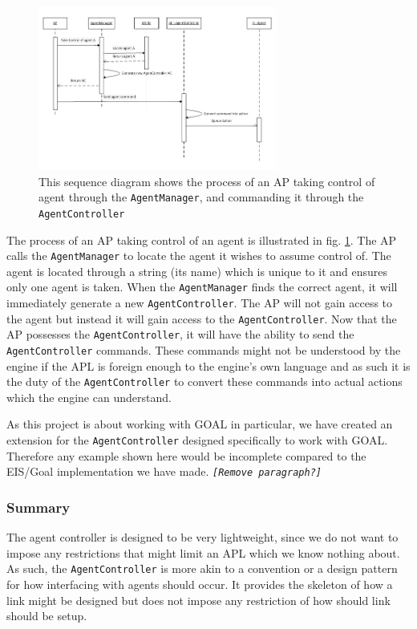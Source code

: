 \begin{figure}
\begin{centering}
\includegraphics[width=0.7\textwidth]{SystemFeatureAgentControllerSequenceDiagram}
\par\end{centering}

\caption{This sequence diagram shows the process of an AP taking control of
agent through the \texttt{AgentManager}, and commanding it through
the \texttt{AgentController\label{fig:APConnectingToAndControllingAC}}}
\end{figure}


The process of an AP taking control of an agent is illustrated in
fig. \ref{fig:APConnectingToAndControllingAC}. The AP calls the \texttt{AgentManager}
to locate the agent it wishes to assume control of. The agent is located
through a string (its name) which is unique to it and ensures only
one agent is taken. When the \texttt{AgentManager} finds the correct
agent, it will immediately generate a new \texttt{AgentController}.
The AP will not gain access to the agent but instead it will gain
access to the \texttt{AgentController}. Now that the AP possesses
the \texttt{AgentController}, it will have the ability to send the
\texttt{AgentController} commands. These commands might not be understood
by the engine if the APL is foreign enough to the engine\textquoteright{}s
own language and as such it is the duty of the \texttt{AgentController}
to convert these commands into actual actions which the engine can
understand.

As this project is about working with GOAL in particular, we have
created an extension for the \texttt{AgentController} designed specifically
to work with GOAL. Therefore any example shown here would be incomplete
compared to the EIS/Goal implementation we have made. \texttt{\emph{{[}Remove
paragraph?{]}}}


\subsubsection*{Summary}

The agent controller is designed to be very lightweight, since we
do not want to impose any restrictions that might limit an APL which
we know nothing about. As such, the \texttt{AgentController} is more
akin to a convention or a design pattern for how interfacing with
agents should occur. It provides the skeleton of how a link might
be designed but does not impose any restriction of how should link
should be setup.
